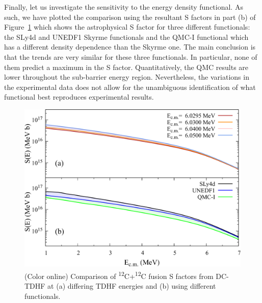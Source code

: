 Finally, let us investigate the sensitivity to the energy density functional. 
As such, we have plotted the comparison using the resultant S factors in part (b) of Figure~\ref{fig:sfaccomp} which shows the astrophysical S factor for three different functionals: the SLy4d \protect\citep{kim1997} and UNEDF1 \protect\citep{kortelainen2012} Skyrme functionals and the QMC-I functional which has a different density dependence than the Skyrme one. 
The main conclusion is that the trends are very similar for these three functionals. In particular, none of them predict a maximum in the S factor. 
Quantitatively, the QMC results are lower throughout the sub-barrier energy region.
Nevertheless, the variations in the experimental data does not allow for the unambiguous identification of what functional best reproduces experimental results.

\begin{figure}
	\includegraphics*[width=\textwidth]{../Figures/CC/SFactorsComp.pdf}
	\caption{(Color online) Comparison of \textsuperscript{12}C+\textsuperscript{12}C fusion S factors from DC-TDHF at (a) differing TDHF energies and (b) using different functionals.}
	\label{fig:sfaccomp}
\end{figure}


